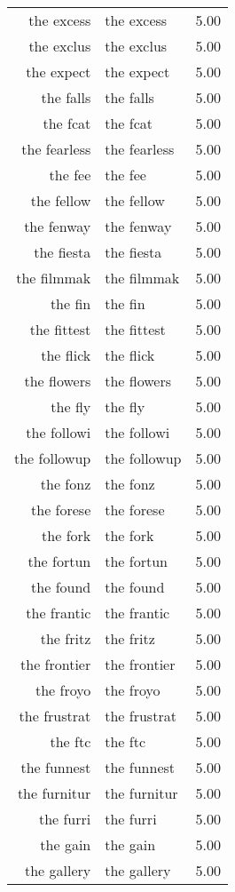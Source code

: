 \begin{table}[ht]
\begin{tabular}{rlr}
  the excess & the excess & 5.00 \\ 
  the exclus & the exclus & 5.00 \\ 
  the expect & the expect & 5.00 \\ 
  the falls & the falls & 5.00 \\ 
  the fcat & the fcat & 5.00 \\ 
  the fearless & the fearless & 5.00 \\ 
  the fee & the fee & 5.00 \\ 
  the fellow & the fellow & 5.00 \\ 
  the fenway & the fenway & 5.00 \\ 
  the fiesta & the fiesta & 5.00 \\ 
  the filmmak & the filmmak & 5.00 \\ 
  the fin & the fin & 5.00 \\ 
  the fittest & the fittest & 5.00 \\ 
  the flick & the flick & 5.00 \\ 
  the flowers & the flowers & 5.00 \\ 
  the fly & the fly & 5.00 \\ 
  the followi & the followi & 5.00 \\ 
  the followup & the followup & 5.00 \\ 
  the fonz & the fonz & 5.00 \\ 
  the forese & the forese & 5.00 \\ 
  the fork & the fork & 5.00 \\ 
  the fortun & the fortun & 5.00 \\ 
  the found & the found & 5.00 \\ 
  the frantic & the frantic & 5.00 \\ 
  the fritz & the fritz & 5.00 \\ 
  the frontier & the frontier & 5.00 \\ 
  the froyo & the froyo & 5.00 \\ 
  the frustrat & the frustrat & 5.00 \\ 
  the ftc & the ftc & 5.00 \\ 
  the funnest & the funnest & 5.00 \\ 
  the furnitur & the furnitur & 5.00 \\ 
  the furri & the furri & 5.00 \\ 
  the gain & the gain & 5.00 \\ 
  the gallery & the gallery & 5.00 \\ 

\end{tabular}
\end{table}

